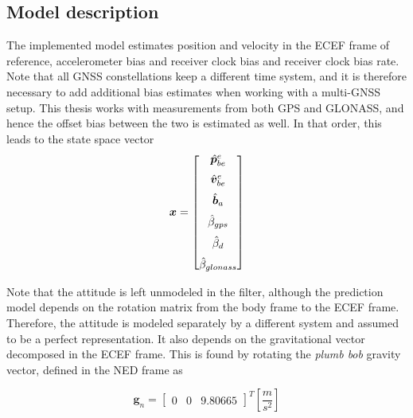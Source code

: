 \subsection{Model description}
    The implemented model estimates position and velocity in the ECEF frame of reference, accelerometer bias and receiver clock bias and receiver clock bias rate. Note that all GNSS constellations keep a different time system, and it is therefore necessary to add additional bias estimates when working with a multi-GNSS setup. This thesis works with measurements from both GPS and GLONASS, and hence the offset bias between the two is estimated as well. In that order, this leads to the state space vector
    \begin{equation}
        \bm{x} = 
        \begin{bmatrix}
            \hat{\bm{p}}^e_{be}\\[6pt]
            \hat{\bm{v}}^e_{be}\\[6pt]
            \hat{\bm{b}}_a\\[6pt]
            \hat{\beta}_{gps}\\[6pt]
            {\hat{\beta}_d}\\[6pt]
            \hat{\beta}_{glonass}
        \end{bmatrix}
    \end{equation}
    
    Note that the attitude is left unmodeled in the filter, although the prediction model depends on the rotation matrix from the body frame to the ECEF frame. Therefore, the attitude is modeled separately by a different system and assumed to be a perfect representation. It also depends on the gravitational vector decomposed in the ECEF frame. This is found by rotating the \textit{plumb bob} gravity vector, defined in the NED frame as

    \begin{equation}
        \label{def:gn}
        \mathbf{g}_n =
        \begin{bmatrix}
            0 & 0 & 9.80665
        \end{bmatrix}^T
        [\frac{m}{s^2}]
    \end{equation}
    

